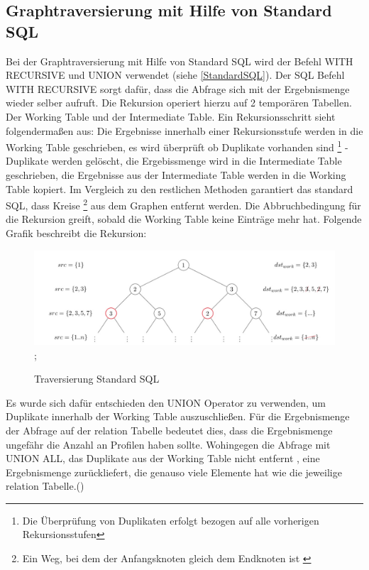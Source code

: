 \subsection{Graphtraversierung mit Hilfe von Standard \ac{SQL}}
Bei der Graphtraversierung mit Hilfe von Standard \ac{SQL} wird der Befehl WITH RECURSIVE und UNION verwendet (siehe \ref{StandardSQL}). Der SQL Befehl WITH RECURSIVE
sorgt dafür, dass die Abfrage sich mit der Ergebnismenge wieder selber aufruft. Die Rekursion operiert hierzu auf 2 temporären Tabellen. Der Working Table und der Intermediate
Table. Ein Rekursionsschritt sieht folgendermaßen aus: Die Ergebnisse innerhalb einer Rekursionsstufe werden in die Working Table geschrieben, es wird überprüft ob Duplikate
vorhanden sind \footnote{Die Überprüfung von Duplikaten erfolgt bezogen auf alle vorherigen Rekursionsstufen} - Duplikate werden gelöscht, die Ergebissmenge wird in
die Intermediate Table geschrieben, die Ergebnisse aus der Intermediate Table werden in die Working Table kopiert. Im Vergleich zu den restlichen Methoden garantiert
das standard SQL, dass Kreise \footnote{Ein Weg, bei dem der Anfangsknoten gleich dem Endknoten ist \cite[S.48]{pbeck01}} aus dem Graphen entfernt werden.
Die Abbruchbedingung für die Rekursion greift, sobald die Working Table keine Einträge mehr hat. Folgende Grafik beschreibt die Rekursion:
\begin{figure}[H]
    \includegraphics[width = \linewidth]{images/RecursiveSelect.jpg};
    \caption{Traversierung Standard SQL}
\end{figure}
Es wurde sich dafür entschieden den UNION Operator zu verwenden, um Duplikate innerhalb der Working Table auszuschließen. Für die  Ergebnismenge der Abfrage auf der
relation Tabelle bedeutet dies, dass die Ergebnismenge ungefähr die Anzahl an Profilen haben sollte. Wohingegen die Abfrage mit UNION ALL, das Duplikate aus der
Working Table nicht entfernt , eine Ergebnismenge zurückliefert, die genauso viele Elemente hat wie die jeweilige relation Tabelle.(\cite{postgresWithRecursive})

